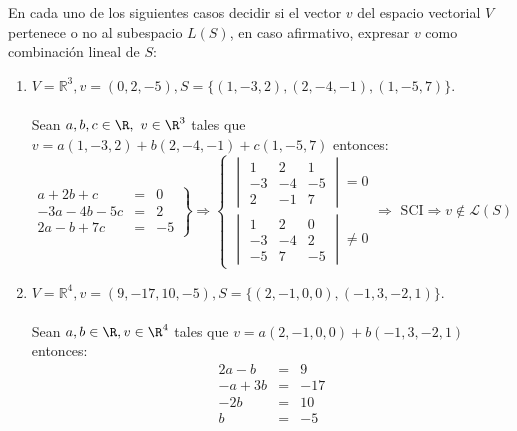 \begin{ejercicio} En cada uno de los siguientes casos decidir si el vector \( v \) del espacio vectorial \( V \) pertenece o no al subespacio \( L(S) \), en caso afirmativo, expresar \( v \) como combinación lineal de \( S \):
	\begin{enumerate}[label=\alph*)]
		\item \( V = \mathbb{R}^3, v = (0,2,-5), S = \{(1,-3,2), (2,-4,-1), (1,-5,7)\} \).
		      \\ \\ Sean $a,b,c \in \R,\ v \in \R^3 $ tales que $v=a(1,-3,2)+b(2,-4,-1)+c(1,-5,7)$ entonces:
		      \begin{equation*}
			      \left.
			      \begin {array}{rcl}
			      a+2b+c & = & 0 \\
			      -3a-4b-5c & = & 2 \\
			      2a-b+7c & = & -5
			      \end {array}
			      \right\} \Rightarrow
			      \begin{cases}
				      \begin{vmatrix}
					      1  & 2  & 1  \\
					      -3 & -4 & -5 \\
					      2  & -1 & 7
				      \end{vmatrix} = 0 \\
				      \begin{vmatrix}
					      1  & 2  & 0  \\
					      -3 & -4 & 2  \\
					      -5 & 7  & -5
				      \end{vmatrix} \neq 0
			      \end{cases}
			      \Rightarrow \text{ SCI} \Rightarrow v \notin \mathcal{L} (S)
		      \end{equation*}
		\item \( V = \mathbb{R}^4, v = (9,-17,10,-5), S = \{(2,-1,0,0), (-1,3,-2,1)\} \).
		      \\ \\ Sean $a,b \in \R, v \in \R^4$ tales que $v = a(2,-1,0,0)+b(-1,3,-2,1)$ entonces:
		      \begin{equation*}
			      \left.
			      \begin {array}{rcl}
			      2a-b & = & 9 \\
			      -a+3b & = & -17 \\
			      -2b & = & 10 \\
			      b & = & -5

\end{array}
\end{equation*}
\end{enumerate}
\end{ejercicio}

